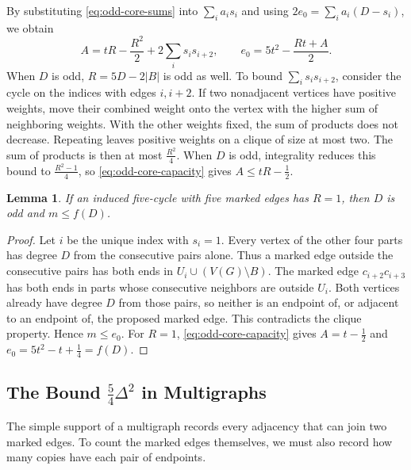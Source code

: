 \documentclass[preprint,11pt,numbers]{elsarticle-arxiv}
\numberwithin{equation}{section}
\newtheorem{lemma}[theorem]{Lemma}
\theoremstyle{definition}
\begin{document}
By substituting \eqref{eq:odd-core-sums} into $\sum_i a_i s_i$
and using $2e_0=\sum_i a_i(D-s_i)$, we obtain
\begin{equation}\label{eq:odd-core-capacity}
 A=tR-\frac{R^2}{2}+2\sum_i s_i s_{i+2},
 \qquad
 e_0=5t^2-\frac{Rt+A}{2}.
\end{equation}
When $D$ is odd, $R=5D-2|B|$ is odd as well. To bound $\sum_i s_i s_{i+2}$,
consider the cycle on the indices with edges $i,i+2$. If two
nonadjacent vertices have positive weights, move their combined
weight onto the vertex with the higher sum of neighboring weights.
With the other weights fixed, the sum of products does not decrease.
Repeating leaves positive weights on a clique of size at most two.
The sum of products is then at most $\frac{R^2}{4}$. When $D$ is odd, integrality reduces this bound to $\frac{R^2-1}{4}$, so
\eqref{eq:odd-core-capacity} gives $A\leq tR-\frac{1}{2}$.

\begin{lemma}\label{lem:odd-unit-slack}
If an induced five-cycle with five marked edges has $R=1$, then $D$ is odd and $m\leq f(D)$.
\end{lemma}

\begin{proof}
Let $i$ be the unique index with $s_i=1$. Every vertex of the other
four parts has degree $D$ from the consecutive pairs alone. Thus a
marked edge outside the consecutive pairs has both ends in
$U_i\cup(V(G)\setminus B)$. The marked edge $c_{i+2}c_{i+3}$ has both
ends in parts whose consecutive neighbors are outside $U_i$. Both
vertices already have degree $D$ from those pairs, so neither is
an endpoint of, or adjacent to an endpoint of, the proposed marked
edge. This contradicts the clique property. Hence $m\leq e_0$.
For $R=1$, \eqref{eq:odd-core-capacity} gives
$A=t-\frac{1}{2}$ and $e_0=5t^2-t+\frac{1}{4}=f(D)$.
\end{proof}

\subsection{The Bound \texorpdfstring{$\frac{5}{4}\Delta^2$}{5 Delta squared / 4} in Multigraphs}
\label{sec:multigraph}\label{sec:weighted-counts}

The simple support of a multigraph records every adjacency that can
join two marked edges. To count the marked edges themselves, we must
also record how many copies have each pair of endpoints.
\end{document}
